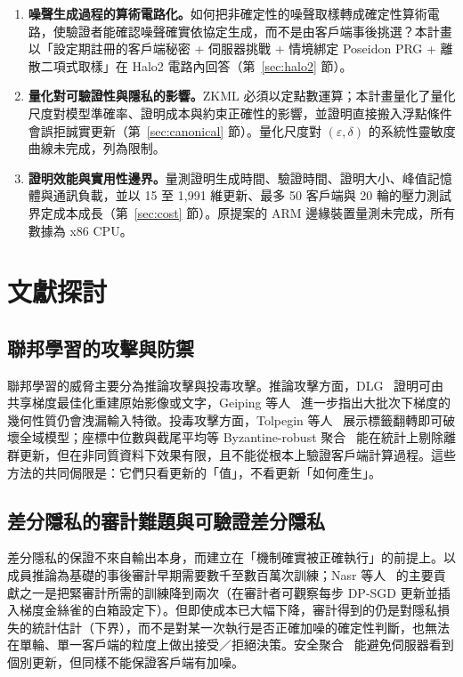 \documentclass[12pt,a4paper]{article}
\newcommand{\eps}{\varepsilon}
\begin{document}
\begin{enumerate}
  \item \textbf{噪聲生成過程的算術電路化。}如何把非確定性的噪聲取樣轉成確定性算術電路，使驗證者能確認噪聲確實依協定生成，而不是由客戶端事後挑選？本計畫以「設定期註冊的客戶端秘密 + 伺服器挑戰 + 情境綁定 Poseidon PRG + 離散二項式取樣」在 Halo2 電路內回答（第~\ref{sec:halo2} 節）。
  \item \textbf{量化對可驗證性與隱私的影響。}ZKML 必須以定點數運算；本計畫量化了量化尺度對模型準確率、證明成本與約束正確性的影響，並證明直接搬入浮點條件會誤拒誠實更新（第~\ref{sec:canonical} 節）。量化尺度對 $(\eps,\delta)$ 的系統性靈敏度曲線未完成，列為限制。
  \item \textbf{證明效能與實用性邊界。}量測證明生成時間、驗證時間、證明大小、峰值記憶體與通訊負載，並以 15 至 1,991 維更新、最多 50 客戶端與 20 輪的壓力測試界定成本成長（第~\ref{sec:cost} 節）。原提案的 ARM 邊緣裝置量測未完成，所有數據為 x86 CPU。
\end{enumerate}


\section{文獻探討}
\subsection{聯邦學習的攻擊與防禦}
聯邦學習的威脅主要分為推論攻擊與投毒攻擊。推論攻擊方面，DLG~\cite{zhu2019deep} 證明可由共享梯度最佳化重建原始影像或文字，Geiping 等人~\cite{geiping2020inverting} 進一步指出大批次下梯度的幾何性質仍會洩漏輸入特徵。投毒攻擊方面，Tolpegin 等人~\cite{tolpegin2020poisoning} 展示標籤翻轉即可破壞全域模型；座標中位數與截尾平均等 Byzantine-robust 聚合~\cite{yin2018byzantine} 能在統計上剔除離群更新，但在非同質資料下效果有限，且不能從根本上驗證客戶端計算過程。這些方法的共同侷限是：它們只看更新的「值」，不看更新「如何產生」。

\subsection{差分隱私的審計難題與可驗證差分隱私}
差分隱私的保證不來自輸出本身，而建立在「機制確實被正確執行」的前提上。以成員推論為基礎的事後審計早期需要數千至數百萬次訓練；Nasr 等人~\cite{nasr2023tight} 的主要貢獻之一是把緊審計所需的訓練降到兩次（在審計者可觀察每步 DP-SGD 更新並插入梯度金絲雀的白箱設定下）。但即使成本已大幅下降，審計得到的仍是對隱私損失的統計估計（下界），而不是對某一次執行是否正確加噪的確定性判斷，也無法在單輪、單一客戶端的粒度上做出接受／拒絕決策。安全聚合~\cite{bonawitz2017secagg} 能避免伺服器看到個別更新，但同樣不能保證客戶端有加噪。
\end{document}
